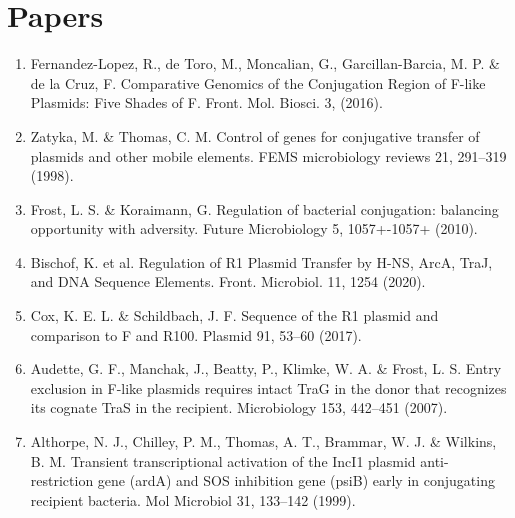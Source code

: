 \documentclass{article}
\begin{document}
\section*{Papers}
\begin{enumerate}
    \item Fernandez-Lopez, R., de Toro, M., Moncalian, G., Garcillan-Barcia, M. P. \& de la Cruz, F. Comparative Genomics of the Conjugation Region of F-like Plasmids: Five Shades of F. Front. Mol. Biosci. 3, (2016).
    \item Zatyka, M. \& Thomas, C. M. Control of genes for conjugative transfer of plasmids and other mobile elements. FEMS microbiology reviews 21, 291–319 (1998).
    \item Frost, L. S. \& Koraimann, G. Regulation of bacterial conjugation: balancing opportunity with adversity. Future Microbiology 5, 1057+-1057+ (2010).
    \item Bischof, K. et al. Regulation of R1 Plasmid Transfer by H-NS, ArcA, TraJ, and DNA Sequence Elements. Front. Microbiol. 11, 1254 (2020).
    \item Cox, K. E. L. \& Schildbach, J. F. Sequence of the R1 plasmid and comparison to F and R100. Plasmid 91, 53–60 (2017).
    \item Audette, G. F., Manchak, J., Beatty, P., Klimke, W. A. \& Frost, L. S. Entry exclusion in F-like plasmids requires intact TraG in the donor that recognizes its cognate TraS in the recipient. Microbiology 153, 442–451 (2007).
    \item Althorpe, N. J., Chilley, P. M., Thomas, A. T., Brammar, W. J. \& Wilkins, B. M. Transient transcriptional activation of the IncI1 plasmid anti-restriction gene (ardA) and SOS inhibition gene (psiB) early in conjugating recipient bacteria. Mol Microbiol 31, 133–142 (1999).
\end{enumerate}
\end{document}
